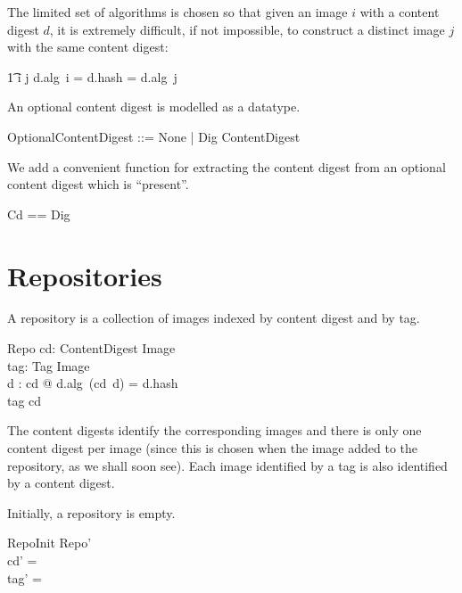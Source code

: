 \documentclass[a4paper,twoside,12pt]{article}
\begin{document}
The limited set of algorithms is chosen so that given an image $i$ with a content digest $d$, it is extremely difficult, if not impossible, to construct
a distinct image $j$ with the same content digest:\\
\begin{zed}
\t1 i \neq j \land d.alg~i = d.hash = d.alg~j
\end{zed}

An optional content digest is modelled as a datatype.
\begin{zed}
    OptionalContentDigest ::= None | Dig \ldata ContentDigest \rdata \\
\end{zed}

We add a convenient function for extracting the content digest from an optional content digest which is ``present''.
\begin{zed}
    Cd == Dig\inv \\
\end{zed}

\newpage
\section{Repositories}

A repository is a collection of images indexed by content digest and by tag.
\begin{schema}{Repo}
    cd: ContentDigest \pinj Image \\
    tag: Tag \pfun Image \\
\where
    \forall d : \dom cd @ d.alg~(cd~d) = d.hash \\
    \ran tag \subseteq \ran cd \\
\end{schema}
The content digests identify the corresponding images and there is only one content digest per image (since this is chosen when the image added
to the repository, as we shall soon see). Each image identified by a tag is also identified by a content digest.

Initially, a repository is empty.
\begin{schema}{RepoInit}
  Repo' \\
\where
  cd' = \emptyset \\
  tag' = \emptyset \\
\end{schema}
 
\end{document}
